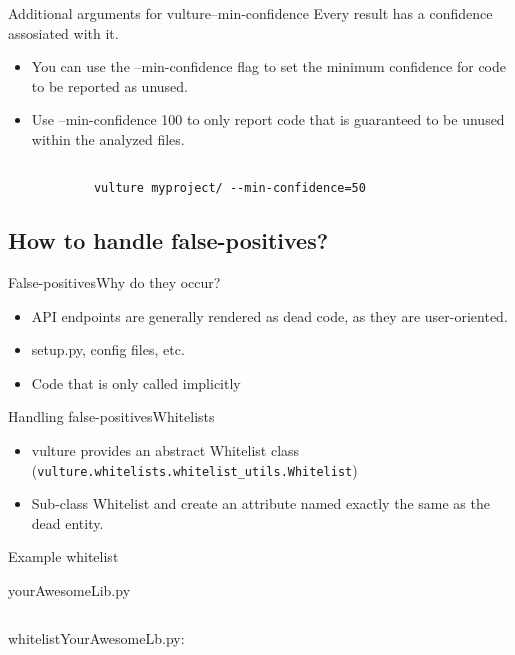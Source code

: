\documentclass{beamer}
\begin{document}
\begin{frame}{Additional arguments for vulture}{--min-confidence}
Every result has a confidence assosiated with it.
\begin{itemize}
    \item You can use the --min-confidence flag to set the minimum confidence for code to be reported as unused.
    \item Use --min-confidence 100 to only report code that is \alert{guaranteed} to be unused within the analyzed files.
\end{itemize}

\begin{example}
        \begin{verbatim}

            vulture myproject/ --min-confidence=50

        \end{verbatim}

\end{example}
\end{frame}

\subsection{How to handle false-positives?}

\begin{frame}{False-positives}{Why do they occur?}
\begin{itemize}
    \item API endpoints are generally rendered as dead code, as they are user-oriented.
    \pause
    \item setup.py, config files, etc.
    \pause
    \item Code that is only called implicitly
\end{itemize}
\end{frame}

\begin{frame}{Handling false-positives}{Whitelists}
\begin{itemize}
    \item vulture provides an abstract Whitelist class (\texttt{vulture.whitelists.whitelist\_utils.Whitelist})
    \item Sub-class \alert{Whitelist} and create an attribute named exactly the same as the dead entity.
\end{itemize}
\end{frame}

\begin{frame}{Example whitelist}
    \begin{block}{yourAwesomeLib.py}
        \inputminted{python}{yourAwesomeLib.py}
    \end{block}
    \begin{block}{whitelistYourAwesomeLb.py:}
        \inputminted{python}{whitelistYourAwesomeLib.py}
    \end{block}
\end{frame}
\end{document}
